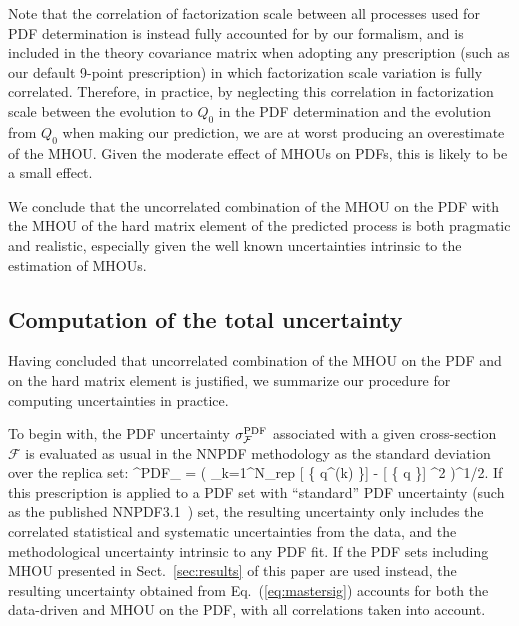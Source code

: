 Note that the correlation of factorization scale between all processes
used for PDF determination is instead fully accounted for by our
formalism, and is included in the theory covariance matrix when
adopting any prescription (such as our default 9-point prescription)
in which factorization scale variation is fully correlated.
%
Therefore,
in practice, by neglecting this correlation in factorization scale between the evolution to $Q_0$ in the PDF determination and the evolution from $Q_0$ when making our prediction, we are at worst producing an overestimate of the MHOU.
%
Given the moderate effect of MHOUs on PDFs, this is likely to be a small effect.

We conclude that the uncorrelated combination of the MHOU on the PDF with the 
MHOU of the hard matrix element of the predicted process is both pragmatic 
and realistic, especially given the well known uncertainties intrinsic to 
the estimation of MHOUs. 

\subsection{Computation of the total uncertainty}
\label{eq:unccomp}

Having concluded that uncorrelated combination of the MHOU on the PDF
and on the hard matrix element is justified, we summarize
our procedure for computing uncertainties in practice.

To begin with, the PDF uncertainty $\sigma^{\rm PDF}_{\mathcal{F}}$
associated with a given cross-section $\mathcal{F}$ is  evaluated
as usual in the NNPDF methodology as the standard deviation over the
replica set:
 \be
\sigma^{\rm PDF}_{} =
\left( 
\sum_{k=1}^{N_{\rm rep}}   
\lp {} [ \{  q^{(k)} \}] 
-   \la {} [ \{  q \}] \ra\rp^2 
 \right)^{1/2}.
 \label{eq:mastersig}
 \ee
%
If this prescription is applied to a PDF set with ``standard'' PDF uncertainty (such as the published
NNPDF3.1~\cite{Ball:2017nwa}) set, the resulting uncertainty only includes
the correlated statistical and systematic uncertainties from the data,
and the methodological uncertainty intrinsic to any PDF fit.
%
If the PDF sets including MHOU
presented in Sect.~\ref{sec:results}
of this paper are used instead, the resulting uncertainty obtained
from Eq.~(\ref{eq:mastersig}) accounts for both the data-driven
and MHOU on the PDF, with all correlations taken into account.

